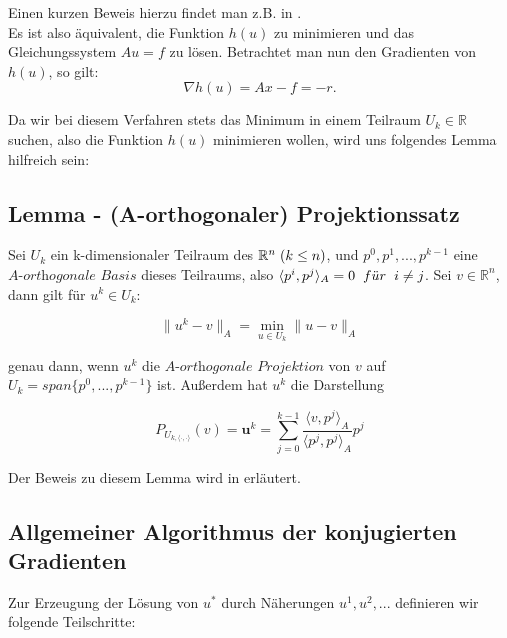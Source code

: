 Einen kurzen Beweis hierzu findet man z.B. in \cite{DR6}.\\
Es ist also äquivalent, die Funktion $h(u)$ zu minimieren und das Gleichungssystem $Au = f$ zu lösen. Betrachtet man nun den Gradienten von $h(u)$, so gilt:
\begin{equation}
\nabla h(u) = Ax - f = -r.
\end{equation}

Da wir bei diesem Verfahren stets das Minimum in einem Teilraum $U_{k} \in \mathbb{R}$ suchen, also die Funktion $h(u)$ minimieren wollen, wird uns folgendes Lemma hilfreich sein:

\subsection{Lemma - (A-orthogonaler) Projektionssatz}\label{s.Projektionssatz}

Sei $U_{k}$ ein k-dimensionaler Teilraum des $\mathbb{R}^{n} \hspace{1mm} (k \le n)$, und $p^{0}, p^{1},...,p^{k-1}$ eine $\textit{A-orthogonale Basis}$ dieses Teilraums, also $\langle p^{i}, p^{j} \rangle _{A} = 0 \hspace{2mm} f\ddot{u}r \hspace{2mm} i \ne j$. Sei $v \in \mathbb{R}^{n}$, dann gilt für $u^{k} \in U_{k}$:

\begin{equation}
\|u^{k} - v\|_{A} = \underset{u \in U_{k}}{\min} \|u - v\|_{A}
\end{equation}

genau dann, wenn $u^{k}$ die $\textit{A-orthogonale Projektion}$ von $v$ auf $U_{k} = span\{p^{0},...,p^{k-1}\}$ ist. Außerdem hat $u^{k}$ die Darstellung

\begin{equation}
P_{U_{k,\langle \cdot,\cdot \rangle}}(v) = \textbf{u}^{k} = \sum_{j=0}^{k-1} \frac {\langle v, p^{j} \rangle _{A}} {\langle p^{j}, p^{j} \rangle _{A}} p^{j}
\end{equation}

Der Beweis zu diesem Lemma wird in \cite{DR7} erläutert.

\subsection{Allgemeiner Algorithmus der konjugierten Gradienten}\label{ss.Allgemeiner CG-Algorithmus}

Zur Erzeugung der Lösung von $u^{*}$ durch Näherungen $u^{1}, u^{2},...$ definieren wir folgende Teilschritte:

